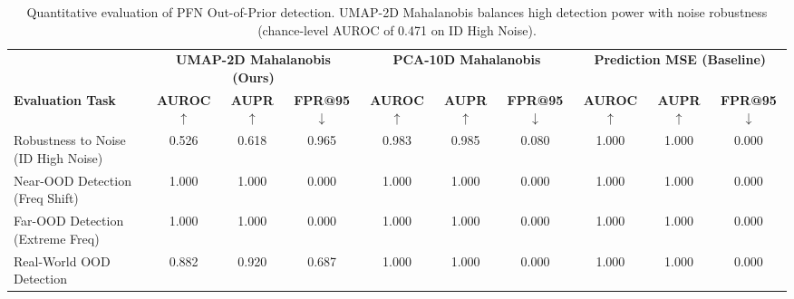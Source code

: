\begin{table}[t]
\centering
\caption{Quantitative evaluation of PFN Out-of-Prior detection. UMAP-2D Mahalanobis balances high detection power with noise robustness (chance-level AUROC of 0.471 on ID High Noise).}
\label{tab:ood_metrics}
\vskip 0.1in
\begin{footnotesize}
\setlength{\tabcolsep}{2.5pt}
\begin{tabular}{l ccc ccc ccc}
\hline
& \multicolumn{3}{c}{\textbf{UMAP-2D Mahalanobis (Ours)}} & \multicolumn{3}{c}{\textbf{PCA-10D Mahalanobis}} & \multicolumn{3}{c}{\textbf{Prediction MSE (Baseline)}} \\
\textbf{Evaluation Task} & \textbf{AUROC} $\uparrow$ & \textbf{AUPR} $\uparrow$ & \textbf{FPR@95} $\downarrow$ & \textbf{AUROC} $\uparrow$ & \textbf{AUPR} $\uparrow$ & \textbf{FPR@95} $\downarrow$ & \textbf{AUROC} $\uparrow$ & \textbf{AUPR} $\uparrow$ & \textbf{FPR@95} $\downarrow$ \\
\hline
Robustness to Noise (ID High Noise) & 0.526 & 0.618 & 0.965 & 0.983 & 0.985 & 0.080 & 1.000 & 1.000 & 0.000 \\
Near-OOD Detection (Freq Shift) & 1.000 & 1.000 & 0.000 & 1.000 & 1.000 & 0.000 & 1.000 & 1.000 & 0.000 \\
Far-OOD Detection (Extreme Freq) & 1.000 & 1.000 & 0.000 & 1.000 & 1.000 & 0.000 & 1.000 & 1.000 & 0.000 \\
Real-World OOD Detection & 0.882 & 0.920 & 0.687 & 1.000 & 1.000 & 0.000 & 1.000 & 1.000 & 0.000 \\
\hline
\end{tabular}
\end{footnotesize}
\end{table}
